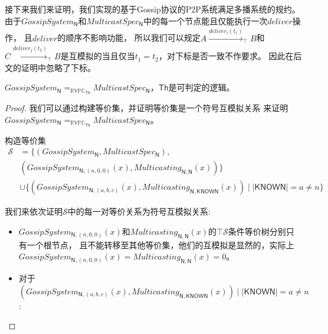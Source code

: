  接下来我们来证明，我们实现的基于Gossip协议的P2P系统满足多播系统的规约。
 由于$GossipSystem_{\mathsf{N}}$和$MulticastSpec_\mathsf{N}$中的每一个节点能且仅能执行一次$deliver$操作，
 且$deliver$的顺序不影响功能，
所以我们可以规定$A\stackrel{\overline{deliver_i}(t_1)}{\longrightarrow}_{\top} B$和$C\stackrel{\overline{deliver_j}(t_2)}{\longrightarrow}_{\top}B$是互模拟的当且仅当$t_1=t_2$，对下标是否一致不作要求。
因此在后文的证明中忽略了下标。
\begin{theorem}
    $GossipSystem_{\mathsf{N}} =_{\mathbb{RVPC}_{\mathsf{Th}}} MulticastSpec_{\mathsf{N}}$，$\mathsf{Th}$是可判定的逻辑。
\end{theorem}
\begin{proof}

我们可以通过构建等价集，并证明等价集是一个符号互模拟关系
来证明$GossipSystem_{\mathsf{N}} =_{\mathbb{RVPC}_{\mathsf{Th}}} MulticastSpec_{\mathsf{N}}$。

构造等价集
\begin{align*}
   \mathcal{S}&=\{(GossipSystem_{\mathsf{N}}, MulticastSpec_{\mathsf{N}}), \\
      &(GossipSystem_{\mathsf{N},(n,0,0)}(x), Multicasting_{\mathsf{N},\mathsf{N}}(x))\}\\
      & \cup \{(GossipSystem_{\mathsf{N},(a,b,c)}(x), Multicasting_{\mathsf{N}, \mathsf{KNOWN}}(x))\mid |\mathsf{KNOWN}| = a\neq n\}
\end{align*}

我们来依次证明$\mathcal{S}$中的每一对等价关系为符号互模拟关系:
\begin{itemize}
    \item {
       $GossipSystem_{\mathsf{N},(n,0,0)}(x)$和$Multicasting_{\mathsf{N},\mathsf{N}}(x)$的$\top \mathcal{S}$条件等价树分别只有一个根节点，
       且不能转移至其他等价集，他们的互模拟是显然的，实际上$GossipSystem_{\mathsf{N},(n,0,0)}(x)=Multicasting_{\mathsf{N},\mathsf{N}}(x)=0$。
    }
    \item {
        对于$(GossipSystem_{\mathsf{N},(a,b,c)}(x), Multicasting_{\mathsf{N}, \mathsf{KNOWN}}(x))\mid |\mathsf{KNOWN}| = a\neq n$:

}
\end{itemize}
\end{proof}

